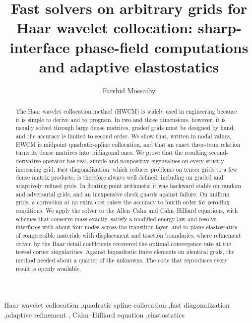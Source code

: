 \documentclass[preprint,12pt]{elsarticle}
\theoremstyle{remark}
\begin{document}
\begin{frontmatter}
\title{Fast solvers on arbitrary grids for Haar wavelet collocation:
sharp-interface phase-field computations and adaptive elastostatics}

\author[inst1]{Farshid Mossaiby}

\begin{abstract}
The Haar wavelet collocation method (HWCM) is widely used in engineering because it is simple to derive
and to program. In two and three dimensions, however, it is usually solved through large dense matrices,
graded grids must be designed by hand, and the accuracy is limited to second order. We show that, written
in nodal values, HWCM is midpoint quadratic-spline collocation, and that an exact three-term relation
turns its dense matrices into tridiagonal ones. We prove that the resulting second-derivative operator has
real, simple and nonpositive eigenvalues on every strictly increasing grid. Fast diagonalization, which
reduces problems on tensor grids to a few dense matrix products, is therefore always well defined,
including on graded and adaptively refined grids. In floating-point arithmetic it was backward stable on
random and adversarial grids, and an inexpensive check guards against failure. On uniform grids, a
correction at no extra cost raises the accuracy to fourth order for zero-flux conditions. We apply the
solver to the Allen--Cahn and Cahn--Hilliard equations, with schemes that conserve mass exactly, satisfy a
modified-energy law and resolve interfaces with about four nodes across the transition layer, and to plane
elastostatics of compressible materials with displacement and traction boundaries, where refinement driven
by the Haar detail coefficients recovered the optimal convergence rate at the tested corner singularities.
Against biquadratic finite elements on identical grids, the method needed about a quarter of the unknowns.
The code that reproduces every result is openly available.
\end{abstract}

\begin{keyword}
Haar wavelet collocation \sep quadratic spline collocation \sep fast diagonalization \sep adaptive refinement \sep
Cahn--Hilliard equation \sep elastostatics
\end{keyword}
\end{frontmatter}
\end{document}
